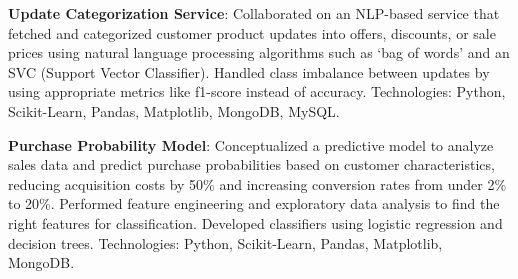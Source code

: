 \begin{cventries}
{\begin{cvitems}
        \item{\textbf{Update Categorization Service}: Collaborated on an NLP-based service that fetched and categorized customer product updates into offers, discounts, or sale prices using natural language processing algorithms such as ‘bag of words’ and an SVC (Support Vector Classifier). \newline 
        Handled class imbalance between updates by using appropriate metrics like f1-score instead of accuracy. 
        Technologies: Python, Scikit-Learn, Pandas, Matplotlib, MongoDB, MySQL.}
        \item{\textbf{Purchase Probability Model}: Conceptualized a predictive model to analyze sales data and predict purchase probabilities based on customer characteristics, reducing acquisition costs by 50\% and increasing conversion rates from under 2\% to 20\%. \newline
        Performed feature engineering and exploratory data analysis to find the right features for classification.
        \newline Developed classifiers using logistic regression and decision trees. \newline Technologies: Python, Scikit-Learn, Pandas, Matplotlib, MongoDB.}
      \end{cvitems}
    }

\end{cventries}